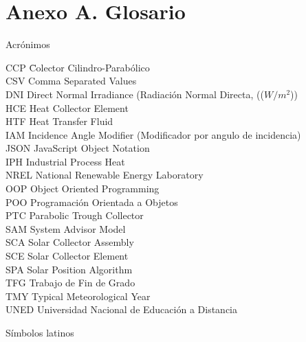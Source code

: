\chapter* {Anexo A. Glosario}

Acrónimos

\begin{tabbing}	
CCP \quad\quad\quad\quad\quad\quad\= Colector Cilindro-Parabólico  \\
CSV \> Comma Separated Values \\
DNI \> Direct Normal Irradiance (Radiación Normal Directa, (($W/m^2$)) \\
HCE \> Heat Collector Element \\
HTF \> Heat Transfer Fluid \\
IAM \> Incidence Angle Modifier (Modificador por angulo de incidencia) \\
JSON \> JavaScript Object Notation \\
IPH \> Industrial Process Heat \\
NREL \> National Renewable Energy Laboratory \\
OOP \> Object Oriented Programming \\
POO  \> Programación Orientada a Objetos \\
PTC \> Parabolic Trough Collector \\
SAM\> System Advisor Model \\
SCA \> Solar Collector Assembly\\
SCE \> Solar Collector Element \\
SPA \> Solar Position Algorithm \\
TFG	\>Trabajo de Fin de Grado \\
TMY \> Typical Meteorological Year \\
UNED \> Universidad Nacional de Educación a Distancia \\
\end{tabbing}


Símbolos latinos

